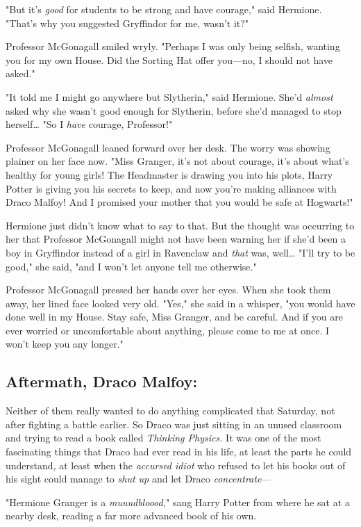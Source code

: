 "But it's \emph{good} for students to be strong and have courage," said 
Hermione. "That's why you suggested Gryffindor for me, wasn't it?"

Professor McGonagall smiled wryly. "Perhaps I was only being selfish, wanting 
you for my own House. Did the Sorting Hat offer you---no, I should not have 
asked."

"It told me I might go anywhere but Slytherin," said Hermione. She'd 
\emph{almost} asked why she wasn't good enough for Slytherin, before she'd 
managed to stop herself{\ldots} "So I \emph{have} courage, Professor!"

Professor McGonagall leaned forward over her desk. The worry was showing 
plainer on her face now. "Miss Granger, it's not about courage, it's about 
what's healthy for young girls! The Headmaster is drawing you into his plots, 
Harry Potter is giving you his secrets to keep, and now you're making alliances 
with Draco Malfoy! And I promised your mother that you would be safe at 
Hogwarts!"

Hermione just didn't know what to say to that. But the thought was occurring to 
her that Professor McGonagall might not have been warning her if she'd been a 
boy in Gryffindor instead of a girl in Ravenclaw and \emph{that} was, 
well{\ldots} "I'll try to be good," she said, "and I won't let anyone tell me 
otherwise."

Professor McGonagall pressed her hands over her eyes. When she took them away, 
her lined face looked very old. "Yes," she said in a whisper, "you would have 
done well in my House. Stay safe, Miss Granger, and be careful. And if you are 
ever worried or uncomfortable about anything, please come to me at once. I 
won't keep you any longer."
\sbreak
\subsection{Aftermath, Draco Malfoy:}

Neither of them really wanted to do anything complicated that Saturday, not 
after fighting a battle earlier. So Draco was just sitting in an unused 
classroom and trying to read a book called \emph{Thinking Physics.} It was one 
of the most fascinating things that Draco had ever read in his life, at least 
the parts he could understand, at least when the \emph{accursed idiot} who 
refused to let his books out of his sight could manage to \emph{shut up} and 
let Draco \emph{concentrate}---

"Hermione Granger is a \emph{muuudbloood,}" sang Harry Potter from where he sat 
at a nearby desk, reading a far more advanced book of his own.

